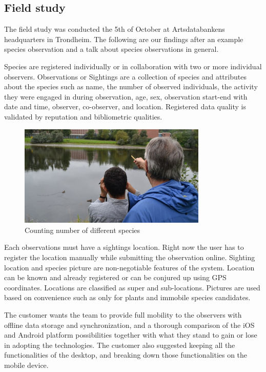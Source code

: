 \subsection{Field study}
\label{sec:field-study}
The field study was conducted the 5th of October at Artsdatabankens headquarters
in Trondheim. The following are our findings after an example species
observation and a talk about species observations in general.

Species are registered individually or in collaboration with two or
more individual observers. Observations or Sightings are a collection of species
and attributes about the species such as name, the number of observed
individuals, the activity they were engaged in during observation, age, sex,
observation start-end with date and time, observer, co-observer, and location.
Registered data quality is validated by reputation and bibliometric qualities.

\begin{figure}[htb]
	\centering
	\includegraphics[width=0.8\textwidth]{prestudy/field_study/field_stud.jpg}
	\caption{Counting number of different species}
	\label{fig:field_study}
\end{figure}

Each observations must have a sightings location. Right now the user has to
register the location manually while submitting the observation online.
Sighting location and species picture are non-negotiable features of the system.
Location can be known and already registered or can be conjured up using GPS
coordinates. Locations are classified as super and sub-locations. Pictures are
used based on convenience such as only for plants and immobile species candidates.

The customer wants the team to provide full mobility to the observers with
offline data storage and synchronization, and a thorough comparison of the iOS
and Android platform possibilities together with what they stand to gain or lose in
adopting the technologies. The customer also suggested keeping all the
functionalities of the desktop, and breaking down those functionalities on the
mobile device.

